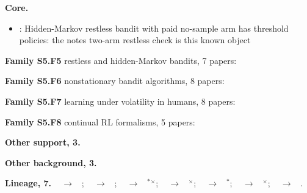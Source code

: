 \documentclass[10pt]{article}
\newcommand{\memb}[1]{\par\smallskip\textbf{#1}\quad}
\begin{document}
\memb{Core.}
\begin{itemize}[nosep,leftmargin=1.2em]
\item \citet{Meshram-whittle16}: Hidden-Markov restless bandit with paid no-sample arm has threshold policies: the notes two-arm restless check is this known object
\end{itemize}
\memb{Family S5.F5} restless and hidden-Markov bandits, 7 papers: {\footnotesize \citetext{\citealp{Meshram-whittle16}; \citealp{Whittle-restless88}; \citealp{Zhao-myopic07}; \citealp{Ahmad-optimality08}; \citealp{Ortner-regret12}; \citealp{Meshram-hidden17}; \citealp{Krishna-optimal26}}}

\memb{Family S5.F6} nonstationary bandit algorithms, 8 papers: {\footnotesize \citetext{\citealp{Liu-nonstationary22}; \citealp{Liu-definition23}; \citealp{Min-informationtheoretic23}; \citealp{Garivier-upperconfidence08}; \citealp{Mellor-thompson13}; \citealp{Besbes-optimal14}; \citealp{Raj-taming17}; \citealp{Chen-new19}}}

\memb{Family S5.F7} learning under volatility in humans, 8 papers: {\footnotesize \citetext{\citealp{Piray-uncertainty26}; \citealp{Yu-uncertainty05}; \citealp{Daw-cortical06}; \citealp{Behrens-learning07}; \citealp{Mathys-bayesian11}\dag; \citealp{Wilson-humans14}; \citealp{Faraji-balancing16}; \citealp{Gershman-deconstructing18}}}

\memb{Family S5.F8} continual RL formalisms, 5 papers: {\footnotesize \citetext{\citealp{Khetarpal-continual20}; \citealp{Padakandla-survey20}; \citealp{Xie-deep20}; \citealp{Abel-definition23}; \citealp{Kumar-continual23}}}

\memb{Other support, 3.} \citetext{\citealp{Adams-bayesian07}; \citealp{Fedus-hyperbolic19}; \citealp{Zhang-bapr26}}

\memb{Other background, 3.} {\footnotesize \citetext{\citealp{Papadimitriou-complexity99}; \citealp{DuranMartin-unifying24}; \citealp{Liang-dynamite24}}}

\memb{Lineage, 7.} {\footnotesize \citeauthor{Gittins-bandit79}~\citeyear{Gittins-bandit79} $\to$ \citeauthor{Whittle-restless88}~\citeyear{Whittle-restless88}; \citeauthor{Whittle-restless88}~\citeyear{Whittle-restless88} $\to$ \citeauthor{Papadimitriou-complexity99}~\citeyear{Papadimitriou-complexity99}; \citeauthor{Whittle-restless88}~\citeyear{Whittle-restless88} $\to$ \citeauthor{LiuZhao-indexability10}~\citeyear{LiuZhao-indexability10}$^\ast$$^\times$; \citeauthor{Whittle-restless88}~\citeyear{Whittle-restless88} $\to$ \citeauthor{Chen-uncertainty21}~\citeyear{Chen-uncertainty21}$^\times$; \citeauthor{Adams-bayesian07}~\citeyear{Adams-bayesian07} $\to$ \citeauthor{Mellor-thompson13}~\citeyear{Mellor-thompson13}$^\ast$; \citeauthor{LiuZhao-indexability10}~\citeyear{LiuZhao-indexability10} $\to$ \citeauthor{Meshram-whittle16}~\citeyear{Meshram-whittle16}$^\times$; \citeauthor{Liu-nonstationary22}~\citeyear{Liu-nonstationary22} $\to$ \citeauthor{Min-informationtheoretic23}~\citeyear{Min-informationtheoretic23}.}
\end{document}
